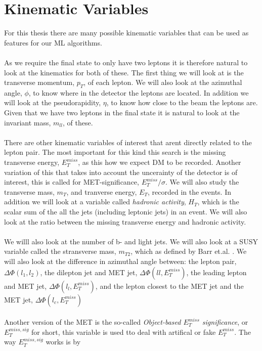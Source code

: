\documentclass[14pt, a4paper]{book}
\begin{document}
\clearpage
\section{Kinematic Variables}
For this thesis there are many possible kinematic variables that can be used  as features for our ML algorithms.\\
\\As we require the final state to only have two leptons it is therefore natural to look at the kinematics for both of these. The first thing we will look at is the transverse momentum, $p_T$, of each lepton. 
We will also look at the azimuthal angle, $\phi$, to know where in the detector the leptons are located. In addition we will look at the pseudorapidity, $\eta$, to know how close to the beam the leptons are. 
Given that we have two leptons in the final state it is natural to look at the invariant mass, $m_{ll}$, of these. \\
\\There are other kinematic variables of interest that arent directly related to the lepton pair. The most important for this kind this search is the missing transverse energy, $E_T^{miss}$, as this how we expect DM to be recorded.
Another variation of this that takes into account the uncerainty of the detector is of interest, this is called for MET-significance, $E_T^{miss}/\sigma$. We will also study the transverse mass, $m_T$, and tranverse energy, $E_T$, recorded in the events.
In addition we will look at a variable called \textit{hadronic activity}, $H_T$, which is the scalar sum of the all the jets (including leptonic jets) in an event. We will also look at the ratio between the missing transverse energy and hadronic activity.\\
\\ We willl also look at the number of b- and light jets. We will also look at a SUSY variable called the stransverse mass, $m_{T2}$, which as defined by Barr et.al. \cite{Barr_2003}. 
We will also look at the difference in azimuthal angle between: the lepton pair, $\Delta\Phi(l_1,l_2)$, the dilepton jet and MET jet, $\Delta\Phi(ll,E_T^{miss})$, the leading lepton and MET jet, $\Delta\Phi(l_l,E_T^{miss})$, 
and the lepton closest to the MET jet and the MET jet, $\Delta\Phi(l_c,E_T^{miss})$\\
\\Another version of the MET is the so-called \textit{Object-based $E_T^{miss}$ significance}, or $E_T^{miss,sig}$ for short, this variable is used tto deal with artifical or fake $E_T^{miss}$. The way $E_T^{miss,sig}$ works is by 
\end{document}
